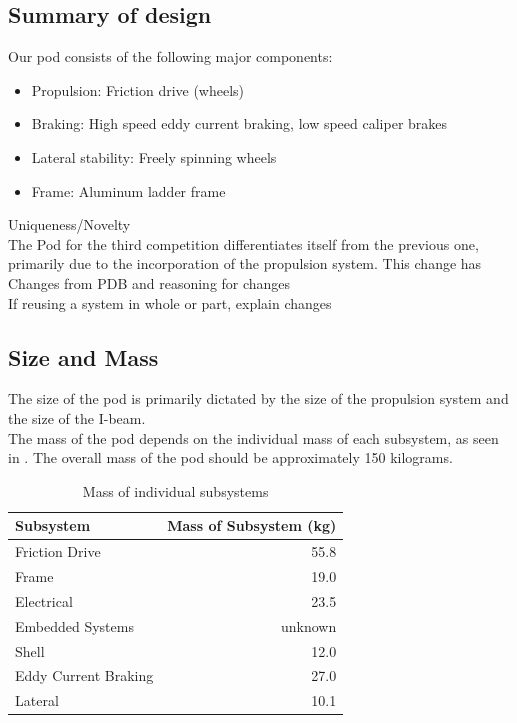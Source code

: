 \documentclass[main.tex]{subfiles}
\begin{document}
\begin{flushleft}
\section{Summary of design}
Our pod consists of the following major components:
\begin{itemize}
    \item Propulsion: Friction drive (wheels)
    \item Braking: High speed eddy current braking, low speed caliper brakes
    \item Lateral stability: Freely spinning wheels
    \item Frame: Aluminum ladder frame
\end{itemize}
Uniqueness/Novelty\\
The Pod for the third competition differentiates itself from the previous one, primarily due to the incorporation of the propulsion system. This change has
Changes from PDB and reasoning for changes\\
If reusing a system in whole or part, explain changes\\

\subsection{Size and Mass}
The size of the pod is primarily dictated by the size of the propulsion system and the size of the I-beam.\\
  The mass of the pod depends on the individual mass of each subsystem, as seen in . The overall mass of the pod should be approximately 150 kilograms.

\begin{table}
\centering
\begin{tabular}{@{}lr@{}}
	\toprule Subsystem & Mass of Subsystem (\si{kg}) \\ \midrule
    Friction Drive & 55.8 \\
    Frame & 19.0 \\
    Electrical & 23.5 \\
    Embedded Systems & unknown \\
    Shell & 12.0 \\
    Eddy Current Braking & 27.0 \\
    Lateral & 10.1 \\
\end{tabular}
  \caption{Mass of individual subsystems}
  \label{table:mass}
\end{table}


\end{flushleft}
\end{document}
